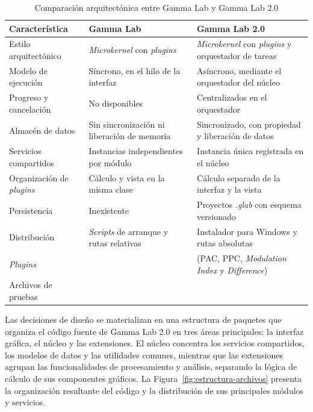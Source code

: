 \documentclass[12pt,letterpaper,oneside]{article}
\begin{document}
\begin{table}[H]
\centering
\scriptsize
\renewcommand{\arraystretch}{1.3}
\begin{tabularx}{\textwidth}{|l|>{\raggedright\arraybackslash}X|>{\raggedright\arraybackslash}X|}
\hline
\textbf{Característica} & \textbf{Gamma Lab} & \textbf{Gamma Lab 2.0} \\
\hline
Estilo arquitectónico & \textit{Microkernel} con \textit{plugins} & \textit{Microkernel} con \textit{plugins} y orquestador de tareas \\
\hline
Modelo de ejecución & Síncrono, en el hilo de la interfaz & Asíncrono, mediante el orquestador del núcleo \\
\hline
Progreso y cancelación & No disponibles & Centralizados en el orquestador \\
\hline
Almacén de datos & Sin sincronización ni liberación de memoria & Sincronizado, con propiedad y liberación de datos \\
\hline
Servicios compartidos & Instancias independientes por módulo & Instancia única registrada en el núcleo \\
\hline
Organización de \textit{plugins} & Cálculo y vista en la misma clase & Cálculo separado de la interfaz y la vista \\
\hline
Persistencia & Inexistente & Proyectos \textit{.glab} con esquema versionado \\
\hline
Distribución & \textit{Scripts} de arranque y rutas relativas & Instalador para Windows y rutas absolutas \\
\hline
\textit{Plugins} & 16 & 20 (PAC, PPC, \textit{Modulation Index} y \textit{Difference}) \\
\hline
Archivos de pruebas & 14 & 80 \\
\hline
\end{tabularx}
\caption{Comparación arquitectónica entre Gamma Lab y Gamma Lab 2.0}
\label{tab:comparacion_arquitectura}
\end{table}

Las decisiones de diseño se materializan en una estructura de paquetes que organiza el código fuente de Gamma Lab 2.0 en tres áreas principales: la interfaz gráfica, el núcleo y las extensiones. El núcleo concentra los servicios compartidos, los modelos de datos y las utilidades comunes, mientras que las extensiones agrupan las funcionalidades de procesamiento y análisis, separando la lógica de cálculo de sus componentes gráficos. La Figura~\ref{fig:estructura-archivos} presenta la organización resultante del código y la distribución de sus principales módulos y servicios.
\end{document}
